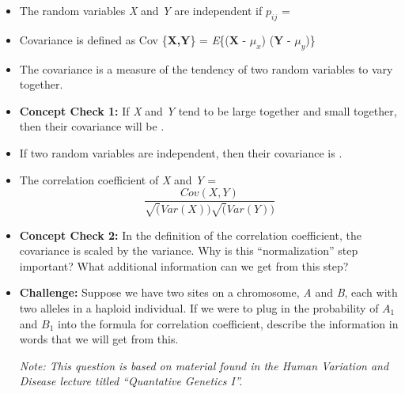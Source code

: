 \documentclass[12pt]{report}
\begin{document}
\begin{itemize}

\item The random variables \textit{X} and \textit{Y} are independent if \textit{$p_{ij}$} = \hrulefill

\item Covariance is defined as Cov \{\textbf{X,Y}\} =  \textit{E}\{\big($\textbf{X - $\mu_{x}$}$\big) \big($\textbf{Y - $\mu_{y}$}$\big)\}

\item The covariance is a measure of the tendency of two random variables to vary together. 

\bigskip
\item \textbf{Concept Check 1:} If \textit{X} and \textit{Y} tend to be large together and small together, then their covariance will be \hrulefill. 

\item If two random variables are independent, then their covariance is \hrulefill.


\item The correlation coefficient of \textit{X} and \textit{Y} = \[\frac{Cov(X, Y)}{\sqrt(Var (X))\sqrt(Var (Y))} \] 

\bigskip
\item \textbf{Concept Check 2:} In the definition of the correlation coefficient, the covariance is scaled by the variance. Why is this ``normalization'' step important? What additional information can we get from this step?

\bigskip

\bigskip

\bigskip
\item \textbf{Challenge:} Suppose we have two sites on a chromosome, \textit{A} and \textit{B}, each with two alleles in a haploid individual. If we were to plug in the probability of \textit{$A_{1}$} and \textit{$B_{1}$} into the formula for correlation coefficient, describe the information in words that we will get from this.

\bigskip

\bigskip

\bigskip
\textit{Note: This question is based on material found in the Human Variation and Disease lecture titled ``Quantative Genetics I''.}


 \end{itemize}

\bigskip

\bigskip

\bigskip
\end{document}
